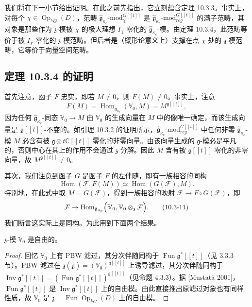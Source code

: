 我们将在下一小节给出证明。在此之前先指出，它立刻蕴含定理 10.3.3。事实上，对每个 $\chi\in\operatorname{Op}_{{}^LG}(D)$，范畴 $\hat{\mathfrak{g}}_{\kappa_c}\text{-mod}^{G[[t]]}_\chi$ 是 $\hat{\mathfrak{g}}_{\kappa_c}\text{-mod}^{G[[t]]}_{reg}$ 的满子范畴，其对象是那些作为 $\mathfrak{z}$-模被 $\chi$ 的极大理想 $I_\chi$ 零化的 $\hat{\mathfrak{g}}_{\kappa_c}$-模。由定理 10.3.4，此范畴等价于被 $I_\chi$ 零化的 $\mathfrak{z}$-模范畴。但后者是（概形论意义上）支撑在点 $\chi$ 处的 $\mathfrak{z}$-模范畴，它等价于向量空间范畴。

\subsection{定理 10.3.4 的证明}

首先注意，函子 $F$ 忠实，即若 $M\neq0$，则 $F(M)\neq0$。事实上，注意
\[
    F(M)=\operatorname{Hom}_{\hat{\mathfrak{g}}_{\kappa_c}}(\mathbb{V}_0,M)
    =M^{\mathfrak{g}[[t]]},
\]
因为任何 $\hat{\mathfrak{g}}_{\kappa_c}$-同态 $\mathbb{V}_0\to M$ 由 $\mathbb{V}_0$ 的生成向量在 $M$ 中的像唯一确定，而该生成向量是 $\mathfrak{g}[[t]]$-不变的。如引理 10.3.2 的证明所示，$\hat{\mathfrak{g}}_{\kappa_c}\text{-mod}^{G[[t]]}_{reg}$ 中任何非零 $\hat{\mathfrak{g}}_{\kappa_c}$-模 $M$ 必含有被 $\mathfrak{g}\otimes t\mathbb{C}[[t]]$ 零化的非零向量。由该向量生成的 $\mathfrak{g}$-模必是平凡的，否则中心在其上的作用不会通过 $\mathfrak{z}$ 分解。因此 $M$ 含有被 $\mathfrak{g}[[t]]$ 零化的非零向量，故 $M^{\mathfrak{g}[[t]]}\neq0$。

其次，我们注意到函子 $G$ 是函子 $F$ 的左伴随，即有一族相容的同构
\begin{equation}
    \operatorname{Hom}(\mathcal{F},F(M))\simeq\operatorname{Hom}(G(\mathcal{F}),M).
    \tag{10.3-10}
\end{equation}
特别地，在此式中取 $M=G(\mathcal{F})$，得到一族相容的映射 $\mathcal{F}\to F\circ G(\mathcal{F})$，即
\begin{equation}
    \mathcal{F}\to\operatorname{Hom}_{\hat{\mathfrak{g}}_{\kappa_c}}
    \Bigl(\mathbb{V}_0,\mathbb{V}_0\otimes_{\mathfrak{z}}\mathcal{F}\Bigr).
    \tag{10.3-11}
\end{equation}
我们断言这实际上是同构。为此用到下面两个结果。

\begin{theorem}
    $\mathfrak{z}$-模 $\mathbb{V}_0$ 是自由的。
\end{theorem}

\begin{proof}
    回忆 $\mathbb{V}_0$ 上有 PBW 滤过，其分次伴随同构于 $\operatorname{Fun}\mathfrak{g}^*[[t]]$（见 3.3.3 节）。PBW 滤过在 $\mathfrak{z}(\hat{\mathfrak{g}})=(\mathbb{V}_0)^{\mathfrak{g}[[t]]}$ 上诱导滤过，其分次伴随同构于 $\operatorname{Inv}\mathfrak{g}^*[[t]]=(\operatorname{Fun}\mathfrak{g}^*[[t]])^{\mathfrak{g}[[t]]}$（见命题 4.3.3）。据 [Mustată 2001]，$\operatorname{Fun}\mathfrak{g}^*[[t]]$ 是 $\operatorname{Inv}\mathfrak{g}^*[[t]]$ 上的自由模。由此直接推出原滤过对象也有同样性质，故 $\mathbb{V}_0$ 是 $\mathfrak{z}=\operatorname{Fun}\operatorname{Op}_{{}^LG}(D)$ 上的自由模。
\end{proof}

